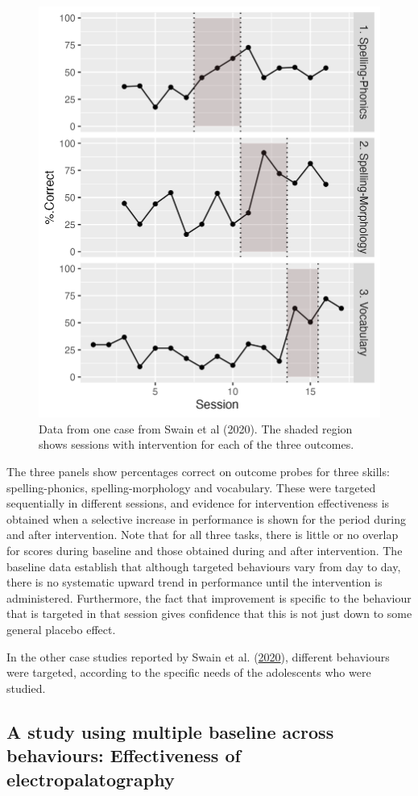 \documentclass{krantz}
\begin{document}
\begin{figure}
\includegraphics[width=0.6\linewidth]{images_bw/swainplot} \caption{Data from one case from  Swain et al (2020). The shaded region shows sessions with intervention for each of the three outcomes.}\label{fig:swainfig}
\end{figure}

The three panels show percentages correct on outcome probes for three skills: spelling-phonics, spelling-morphology and vocabulary. These were targeted sequentially in different sessions, and evidence for intervention effectiveness is obtained when a selective increase in performance is shown for the period during and after intervention. Note that for all three tasks, there is little or no overlap for scores during baseline and those obtained during and after intervention. The baseline data establish that although targeted behaviours vary from day to day, there is no systematic upward trend in performance until the intervention is administered. Furthermore, the fact that improvement is specific to the behaviour that is targeted in that session gives confidence that this is not just down to some general placebo effect.

In the other case studies reported by Swain et al. (\protect\hyperlink{ref-swain2020}{2020}), different behaviours were targeted, according to the specific needs of the adolescents who were studied.

\hypertarget{a-study-using-multiple-baseline-across-behaviours-effectiveness-of-electropalatography}{%
\subsection{A study using multiple baseline across behaviours: Effectiveness of electropalatography}\label{a-study-using-multiple-baseline-across-behaviours-effectiveness-of-electropalatography}}
\end{document}
